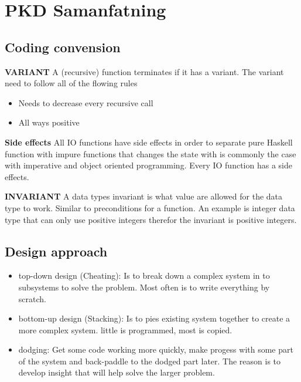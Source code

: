 \chapter{PKD Samanfatning}

\newpage

\section{Coding convension}
\noindent\textbf{VARIANT} \newline
A (recursive) function terminates if it has a variant.
The variant need to follow all of the flowing rules

\begin{itemize}
\item Needs to decrease every recursive call
\item All ways positive
\end{itemize} 

\noindent\textbf{Side effects} \newline
All IO functions have side effects in order to separate pure Haskell function with impure functions
that changes the state with is commonly the case with imperative and object oriented programming.
Every IO function has a side effects.

\noindent\textbf{INVARIANT} \newline
A data types invariant is what value are allowed for the data type to work. Similar to preconditions for
a function. An example is integer data type that can only use positive integers therefor the
invariant is positive integers.



\section{Design approach}
\begin{itemize}
\item top-down design (Cheating): Is to break down a complex system in to subsystems to solve the problem.
  Most often is to write everything by scratch.
\item bottom-up design (Stacking): Is to pies existing system together to create a more complex system.
  little is programmed, most is copied.
\item dodging: Get some code working more quickly, make progess with some part of the system
  and back-paddle to the dodged part later. The reason is to develop insight that will help solve
  the larger problem.
\end{itemize}


